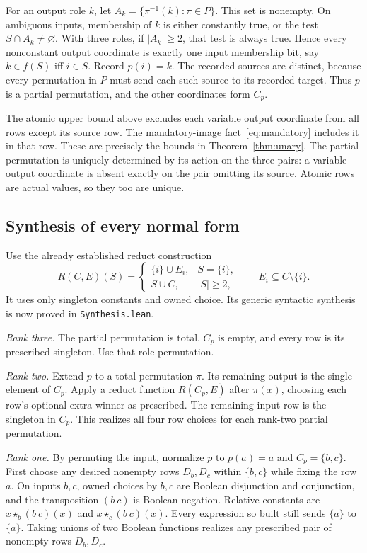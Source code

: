 \documentclass[11pt]{article}
\newcommand{\ow}[1]{\mathbin{\star_{#1}}}
\begin{document}
For an output role $k$, let $A_k=\{\pi^{-1}(k):\pi\in P\}$. This set
is nonempty. On ambiguous inputs, membership of $k$ is either constantly
true, or the test $S\cap A_k\ne\varnothing$. With three roles, if
$|A_k|\geq2$, that test is always true. Hence every nonconstant output
coordinate is exactly one input membership bit, say $k\in f(S)$ iff
$i\in S$. Record $p(i)=k$. The recorded sources are distinct, because
every permutation in $P$ must send each such source to its recorded
target. Thus $p$ is a partial permutation, and the other coordinates
form $C_p$.

The atomic upper bound above excludes each variable output coordinate
from all rows except its source row. The mandatory-image
fact~\eqref{eq:mandatory} includes it in that row. These are precisely
the bounds in Theorem~\ref{thm:unary}. The partial permutation is
uniquely determined by its action on the three pairs: a variable output
coordinate is absent exactly on the pair omitting its source. Atomic
rows are actual values, so they too are unique.

\subsection{Synthesis of every normal form}

Use the already established reduct construction
\[
 R(C,E)(S)=\begin{cases}\{i\}\cup E_i,&S=\{i\},\\
 S\cup C,&|S|\geq2,\end{cases}\qquad E_i\subseteq C\setminus\{i\}.
\]
It uses only singleton constants and owned choice. Its generic syntactic
synthesis is now proved in \texttt{Synthesis.lean}.

\emph{Rank three.} The partial permutation is total, $C_p$ is empty,
and every row is its prescribed singleton. Use that role permutation.

\emph{Rank two.} Extend $p$ to a total permutation $\pi$. Its remaining
output is the single element of $C_p$. Apply a reduct function $R(C_p,E)$
after $\pi(x)$, choosing each row's optional extra winner as prescribed.
The remaining input row is the singleton in $C_p$. This realizes all
four row choices for each rank-two partial permutation.

\emph{Rank one.} By permuting the input, normalize $p$ to $p(a)=a$ and
$C_p=\{b,c\}$. First choose any desired nonempty rows $D_b,D_c$ within
$\{b,c\}$ while fixing the row $a$. On inputs $b,c$, owned choices by
$b,c$ are Boolean disjunction and conjunction, and the transposition
$(b\ c)$ is Boolean negation. Relative constants are
$x\ow b(b\ c)(x)$ and $x\ow c(b\ c)(x)$. Every expression so built
still sends $\{a\}$ to $\{a\}$. Taking unions of two Boolean functions
realizes any prescribed pair of nonempty rows $D_b,D_c$.
\end{document}
